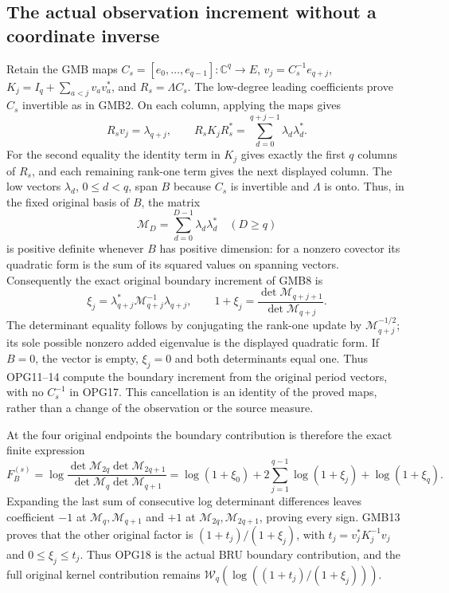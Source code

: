 \documentclass[11pt,a4paper]{article}
\begin{document}
\subsection{The actual observation increment without a coordinate inverse}
Retain the GMB maps
$C_s=[e_0,\ldots,e_{q-1}]:\mathbb C^q\to E$,
$v_j=C_s^{-1}e_{q+j}$,
$K_j=I_q+\sum_{a<j}v_av_a^*$, and $R_s=\Lambda C_s$.
The low-degree leading coefficients prove $C_s$ invertible as in
GMB2. On each column, applying the maps gives
\[
 R_s v_j=\lambda_{q+j},\qquad
 R_sK_jR_s^*=\sum_{d=0}^{q+j-1}\lambda_d\lambda_d^*.
 \tag{OPG15}
\]
For the second equality the identity term in $K_j$ gives exactly
the first $q$ columns of $R_s$, and each remaining rank-one term
gives the next displayed column. The low vectors $\lambda_d$,
$0\leq d<q$, span $B$ because $C_s$ is invertible and $\Lambda$
is onto. Thus, in the fixed original basis of $B$, the matrix
\[
 \mathcal M_D=\sum_{d=0}^{D-1}\lambda_d\lambda_d^*\quad(D\geq q)
 \tag{OPG16}
\]
is positive definite whenever $B$ has positive dimension:
for a nonzero covector its quadratic form is the sum of its
squared values on spanning vectors. Consequently the exact
original boundary increment of GMB8 is
\[
 \boxed{\displaystyle
 \xi_j=\lambda_{q+j}^*\mathcal M_{q+j}^{-1}\lambda_{q+j},\qquad
 1+\xi_j=\frac{\det\mathcal M_{q+j+1}}{\det\mathcal M_{q+j}}.}
 \tag{OPG17}
\]
The determinant equality follows by conjugating the rank-one
update by $\mathcal M_{q+j}^{-1/2}$; its sole possible nonzero
added eigenvalue is the displayed quadratic form. If $B=0$,
the vector is empty, $\xi_j=0$ and both determinants equal one.
Thus OPG11--14 compute the boundary increment from the original
period vectors, with no $C_s^{-1}$ in OPG17. This cancellation
is an identity of the proved maps, rather than a change of the
observation or the source measure.

At the four original endpoints the boundary contribution is
therefore the exact finite expression
\[
 F_B^{(s)}=
 \log\frac{\det\mathcal M_{2q}\det\mathcal M_{2q+1}}
                 {\det\mathcal M_q\det\mathcal M_{q+1}}
 =\log(1+\xi_0)+2\sum_{j=1}^{q-1}\log(1+\xi_j)
                         +\log(1+\xi_q).
 \tag{OPG18}
\]
Expanding the last sum of consecutive log determinant differences
leaves coefficient $-1$ at $\mathcal M_q,\mathcal M_{q+1}$ and
$+1$ at $\mathcal M_{2q},\mathcal M_{2q+1}$, proving every sign.
GMB13 proves that the other original factor is
$(1+t_j)/(1+\xi_j)$, with $t_j=v_j^*K_j^{-1}v_j$ and
$0\leq\xi_j\leq t_j$. Thus OPG18 is the actual BRU boundary
contribution, and the full original kernel contribution remains
$\mathcal W_q(\log((1+t_j)/(1+\xi_j)))$.
\end{document}
